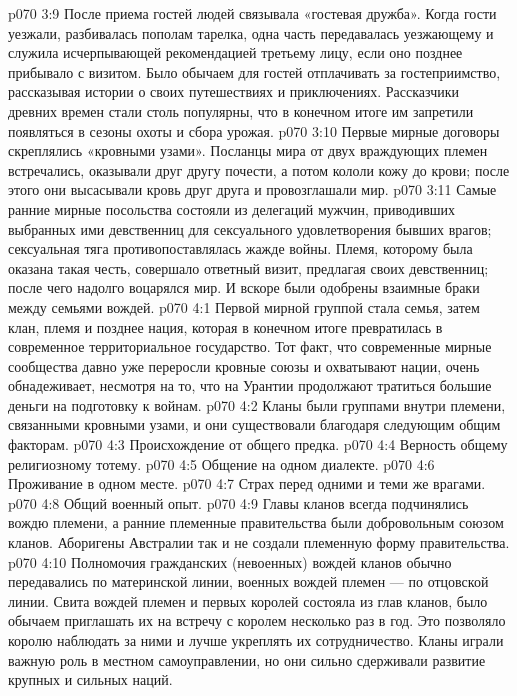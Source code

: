 \vs p070 3:9 После приема гостей людей связывала «гостевая дружба». Когда гости уезжали, разбивалась пополам тарелка, одна часть передавалась уезжающему и служила исчерпывающей рекомендацией третьему лицу, если оно позднее прибывало с визитом. Было обычаем для гостей отплачивать за гостеприимство, рассказывая истории о своих путешествиях и приключениях. Рассказчики древних времен стали столь популярны, что в конечном итоге им запретили появляться в сезоны охоты и сбора урожая.
\vs p070 3:10 Первые мирные договоры скреплялись «кровными узами». Посланцы мира от двух враждующих племен встречались, оказывали друг другу почести, а потом кололи кожу до крови; после этого они высасывали кровь друг друга и провозглашали мир.
\vs p070 3:11 Самые ранние мирные посольства состояли из делегаций мужчин, приводивших выбранных ими девственниц для сексуального удовлетворения бывших врагов; сексуальная тяга противопоставлялась жажде войны. Племя, которому была оказана такая честь, совершало ответный визит, предлагая своих девственниц; после чего надолго воцарялся мир. И вскоре были одобрены взаимные браки между семьями вождей.
\vs p070 4:1 Первой мирной группой стала семья, затем клан, племя и позднее нация, которая в конечном итоге превратилась в современное территориальное государство. Тот факт, что современные мирные сообщества давно уже переросли кровные союзы и охватывают нации, очень обнадеживает, несмотря на то, что на Урантии продолжают тратиться большие деньги на подготовку к войнам.
\vs p070 4:2 Кланы были группами внутри племени, связанными кровными узами, и они существовали благодаря следующим общим факторам.
\vs p070 4:3 \bibnobreakspace Происхождение от общего предка.
\vs p070 4:4 \bibnobreakspace Верность общему религиозному тотему.
\vs p070 4:5 \bibnobreakspace Общение на одном диалекте.
\vs p070 4:6 \bibnobreakspace Проживание в одном месте.
\vs p070 4:7 \bibnobreakspace Страх перед одними и теми же врагами.
\vs p070 4:8 \bibnobreakspace Общий военный опыт.
\vs p070 4:9 \pc Главы кланов всегда подчинялись вождю племени, а ранние племенные правительства были добровольным союзом кланов. Аборигены Австралии так и не создали племенную форму правительства.
\vs p070 4:10 Полномочия гражданских (невоенных) вождей кланов обычно передавались по материнской линии, военных вождей племен --- по отцовской линии. Свита вождей племен и первых королей состояла из глав кланов, было обычаем приглашать их на встречу с королем несколько раз в год. Это позволяло королю наблюдать за ними и лучше укреплять их сотрудничество. Кланы играли важную роль в местном самоуправлении, но они сильно сдерживали развитие крупных и сильных наций.
